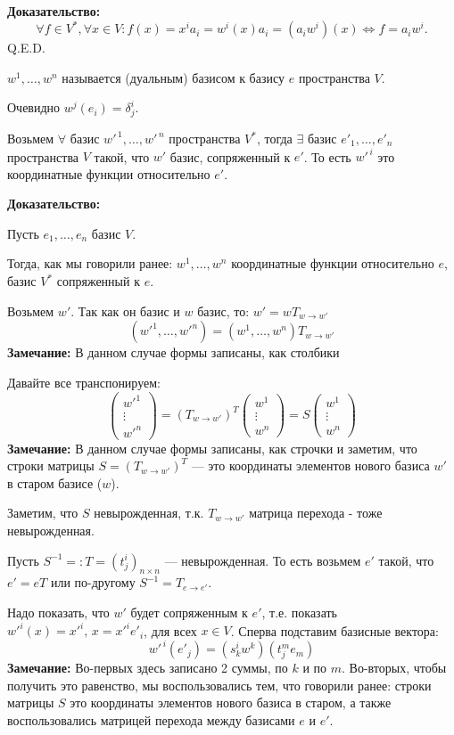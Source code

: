\textbf{Доказательство:}
$$\forall f \in V^*, \forall x \in V: f(x) = x^ia_i = w^i(x)a_i = (a_iw^i)(x) \Leftrightarrow f = a_iw^i.$$
\hfill Q.E.D.


 $w^1,\ldots, w^n$ называется  (дуальным) базисом к базису $e$ пространства $V$.

Очевидно $w^j(e_i) = \delta^i_j$.


Возьмем $\forall$ базис $w'^{\,1},\ldots, w'^{\,n}$ пространства $V^*$, тогда $\exists$ базис $e'_1, \ldots, e'_n$ пространства $V$ такой, что $w'$ базис, сопряженный к $e'$. То есть $w'^{\,i} $ это координатные функции относительно $e'$.

\textbf{Доказательство:}


Пусть $e_1,\dots ,e_n \text{ базис } V$.

Тогда, как мы говорили ранее:
$ w^1,\dots,w^n $ координатные функции относительно $e$, базис $V^*$ сопряженный к $e$.

Возьмем $w'$. Так как он базис и $w$ базис, то:  $w' =wT_{w \rightarrow w'}$
$$(w'^1,\ldots,w'^n)=(w^1,\ldots,w^n)T_{w \to w'}$$
\textbf{Замечание:} В данном случае формы записаны, как столбики

Давайте все транспонируем:
$$\begin{pmatrix}
    w'^1 \\
    \vdots \\
    {w'}^n
\end{pmatrix} = (T_{w \to w'})^T \begin{pmatrix}
    w^1 \\
    \vdots \\
    {w}^n
\end{pmatrix}= S \begin{pmatrix}
    w^1 \\
    \vdots \\
    {w}^n
\end{pmatrix}$$
\textbf{Замечание:} В данном случае формы записаны, как строчки и заметим, что строки матрицы $S = (T_{w \to w'})^T$ --- это координаты элементов нового базиса $w'$ в старом базисе ($w$).

Заметим, что $S$ невырожденная, т.к. $T_{w \to w'}$ матрица перехода - тоже невырожденная.

Пусть $S^{-1}=:T=(t^i_j)_{n \times n}$ --- невырожденная.  То есть возьмем $e'$ такой, что $e' = e T$ или по-другому $S^{-1} =T_{e\rightarrow e'}$.


Надо показать, что $w'$ будет сопряженным к $e'$, т.е. показать ${w'}^{ i}(x)={x'}^i, \, x = {x'}^i {e'}_i$, для всех $ x \in V$. Сперва подставим базисные  вектора:
$$w'^{\, i}(e'_j)  = (s^i_k w^k)(t_j^me_m) $$
\textbf{Замечание:} Во-первых здесь  записано 2 суммы, по $k$ и по $m$. Во-вторых, чтобы получить это равенство, мы воспользовались тем, что говорили ранее: строки матрицы $S$ это координаты элементов нового базиса в старом, а также воспользовались матрицей перехода между базисами $e$ и $e'$.

